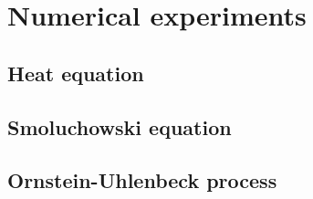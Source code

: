 {\color{red}

}

\chapter{Numerical experiments}

\section{Heat equation}




\section{Smoluchowski equation}


\section{Ornstein-Uhlenbeck process}